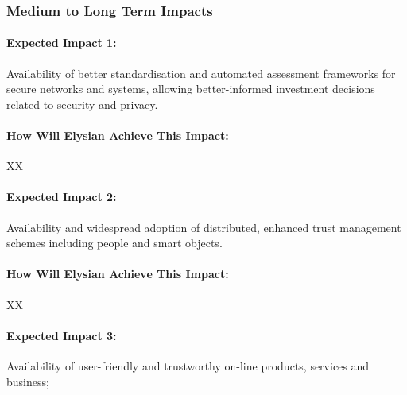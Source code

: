 \documentclass[a4paper,11pt]{article}
\newcommand{\project}[1]{\textbf{#1}\xspace}
\newcommand{\SECURITY}{\project{Elysian}}
\newcommand{\TheProject}{\SECURITY}
\begin{document}
\subsubsection{Medium to Long Term Impacts}

\begin{mdframed}[backgroundcolor=blue!5]
\paragraph{Expected Impact 1:}
Availability of better standardisation and automated assessment frameworks for secure networks and systems, allowing better-informed investment decisions related to security and privacy.
\end{mdframed}

\begin{mdframed}[backgroundcolor=gray!10]
\paragraph{How Will \TheProject{} Achieve This Impact:}
XX
\end{mdframed}

\begin{mdframed}[backgroundcolor=blue!5]
\paragraph{Expected Impact 2:}
Availability and widespread adoption of distributed, enhanced trust management schemes including people and smart objects.
\end{mdframed}

\begin{mdframed}[backgroundcolor=gray!10]
\paragraph{How Will \TheProject{} Achieve This Impact:}
XX
\end{mdframed}

\begin{mdframed}[backgroundcolor=blue!5]
\paragraph{Expected Impact 3:}
Availability of user-friendly and trustworthy on-line products, services and business;
\end{mdframed}
\end{document}
